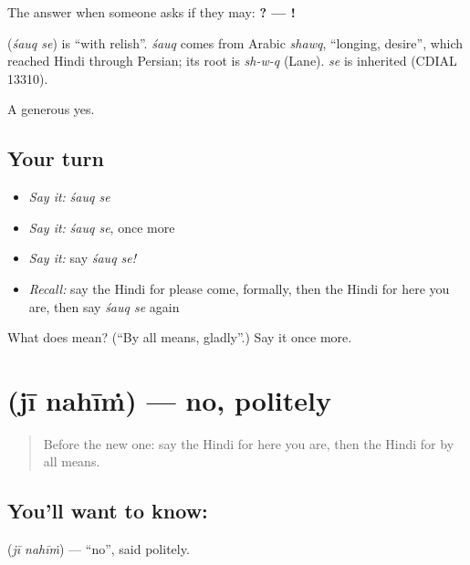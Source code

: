 The answer when someone asks if they may: \textbf{    ? —  !}

\begin{cousinweb}
\textbf{ } (\emph{śauq se}) is \textquotedblleft{}with relish\textquotedblright{}. \emph{śauq} comes from Arabic \emph{shawq}, \textquotedblleft{}longing, desire\textquotedblright{}, which reached Hindi through Persian; its root is \emph{sh-w-q} (Lane). \emph{se} is inherited (CDIAL 13310).
\end{cousinweb}

\begin{grammarlens}[title={What you've built}]
A generous yes.
\end{grammarlens}

\subsection*{Your turn}
\begin{itemize}
\raggedright
  \item \emph{Say it:} \emph{śauq se}
  \item \emph{Say it:} \emph{śauq se}, once more
  \item \emph{Say it:} say \emph{śauq se!}
  \item \emph{Recall:} say the Hindi for please come, formally, then the Hindi for here you are, then say \emph{śauq se} again
\end{itemize}

\begin{tcolorbox}[breakable,colback=teal!4,colframe=teal!35!black,title={Before you move on}]
What does   mean? (\textquotedblleft{}By all means, gladly\textquotedblright{}.) Say it once more.
\end{tcolorbox}
\section[\texorpdfstring{\hi{जी} \hi{नहीं} (jī nahīṁ)}{जी नहीं (jī nahīṁ)}]{  (jī nahīṁ) — no, politely}

\label{lesson:HI-C115-jinahin}



\begin{quote}
Before the new one: say the Hindi for here you are, then the Hindi for by all means.
\end{quote}

\subsection*{You'll want to know:  }
\textbf{ } (\emph{jī nahīṁ}) — \textquotedblleft{}no\textquotedblright{}, said politely.

